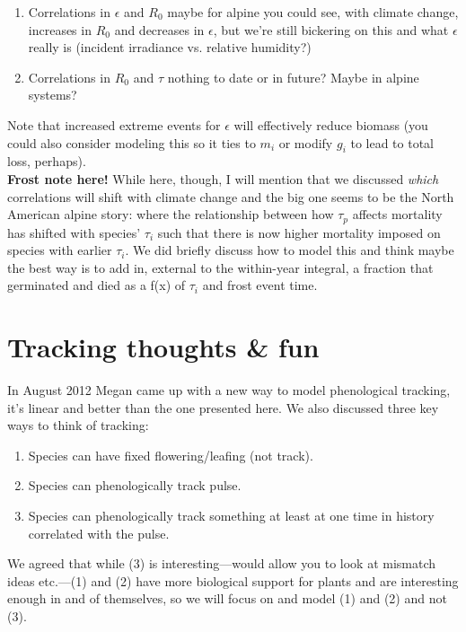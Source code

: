\documentclass[11pt,a4paper,oneside]{article}
\begin{document}
\begin{enumerate}
\item Correlations in \(\epsilon\) and \(R_{0}\) maybe for alpine you could see, with climate change, increases in \(R_{0}\)  and decreases in \(\epsilon\), but we're still bickering on this and what \(\epsilon\) really is (incident irradiance vs. relative humidity?)
\item Correlations in \(R_{0}\) and \(\tau\) nothing to date or in future? Maybe in alpine systems?
\end{enumerate}

Note that increased extreme events for \(\epsilon\)  will effectively reduce biomass (you could also consider modeling this so it ties to \(m_{i}\) or modify \(g_{i}\) to lead to total loss, perhaps).\\

{\bf Frost note here!} While here, though, I will mention that we discussed \emph{which} correlations will shift with climate change and the big one seems to be the North American alpine story: where the relationship between how \(\tau_{p}\) affects mortality has shifted with species' \(\tau_{i}\) such that there is now higher mortality imposed on species with earlier \(\tau_{i}\). We did briefly discuss how to model this and think maybe the best way is to add in, external to the within-year integral, a fraction that germinated and died as a f(x) of \(\tau_{i}\)  and frost event time.\\

\section{Tracking thoughts \& fun}\label{trackingthoughts}
In August 2012 Megan came up with a new way to model phenological tracking, it's linear and better than the one presented here. We also discussed three key ways to think of tracking:
\begin{enumerate}
\item Species can have fixed flowering/leafing (not track).
\item Species can phenologically track pulse.
\item Species can phenologically track something at least at one time in history correlated with the pulse.
\end{enumerate}
We agreed that while (3) is interesting---would allow you to look at mismatch ideas etc.---(1) and (2) have more biological support for plants and are interesting enough in and of themselves, so we will focus on and model (1) and (2) and not (3).\\
\end{document}
